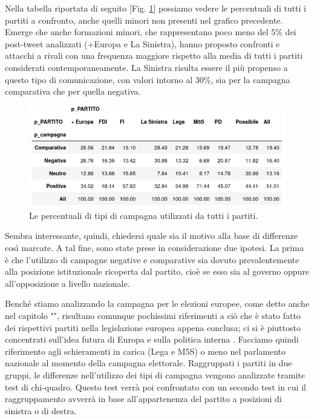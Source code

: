 Nella tabella riportata di seguito [Fig. \ref{fig:partiti2}] possiamo vedere le percentuali di tutti i partiti a confronto, anche quelli minori non presenti nel grafico precedente. Emerge che anche formazioni minori, che rappresentano poco meno del 5\% dei post-tweet analizzati (+Europa e La Sinistra), hanno proposto confronti e attacchi a rivali con una frequenza maggiore rispetto alla media di tutti i partiti considerati contemporaneamente. La Sinistra risulta essere il più propenso a questo tipo di comunicazione, con valori intorno al 30\%, sia per la campagna comparativa che per quella negativa.
\begin{figure}
	\includegraphics[width=\textwidth]{figures/partiticampagna}
	\caption{Le percentuali di tipi di campagna utilizzati da tutti i partiti.}
	\label{fig:partiti2}
\end{figure}

Sembra interessante, quindi, chiedersi quale sia il motivo alla base di differenze così marcate. A tal fine, sono state prese in considerazione due ipotesi. La prima è che l'utilizzo di campagne negative e comparative sia dovuto prevalentemente alla posizione istituzionale ricoperta dal partito, cioè se esso sia al governo oppure all'opposizione a livello nazionale.

Benché stiamo analizzando la campagna per le elezioni europee, come detto anche nel capitolo "", risultano comunque pochissimi riferimenti a ciò che è stato fatto dei rispettivi partiti nella legislazione europea appena conclusa; ci si è piuttosto concentrati sull'idea futura di Europa e sulla politica interna \citep{seddone2019}. Facciamo quindi riferimento agli schieramenti in carica (Lega e M5S) o meno nel parlamento nazionale al momento della campagna elettorale. Raggruppati i partiti in due gruppi, le  differenze nell'utilizzo dei tipi di campagna vengono analizzate tramite test di chi-quadro. Questo test verrà poi confrontato con un secondo test in cui il raggruppamento avverrà in base all'appartenenza del partito a posizioni di sinistra o di destra.

